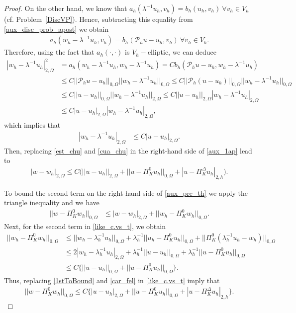 \documentclass[final,reqno]{elsarticle}
\def\O{\Omega}
\def\PiK{\Pi_{K}^{\Delta}}
\begin{document}
\begin{proof}
On the other hand, we know that $a_h(\lambda^{-1}u_h,v_h)=b_h(u_h,v_h)\ \forall v_h \in V_h $ (cf. Problem~\ref{DiscVP}). Hence, subtracting this equality from \eqref{aux_disc_prob_apost} we obtain 
\begin{align*}
a_h(w_h-\lambda^{-1}u_h,v_h)=b_h(\mathcal{P}_hu-u_h,v_h) \ \forall v_h \in V_h .
\end{align*}
Therefore, using the fact that $a_h(\cdot,\cdot)$ is $V_h-$elliptic, we can deduce
\begin{align}
|w_h-\lambda^{-1}u_h|_{2,\O}^2&=a_h(w_h-\lambda^{-1}u_h,w_h-\lambda^{-1}u_h)=Cb_h(\mathcal{P}_hu-u_h,w_h-\lambda^{-1}u_h)\nonumber\\
&\leq C || \mathcal{P}_hu-u_h||_{0,\O}||w_h-\lambda^{-1}u_h ||_{0,\O}\leq C || \mathcal{P}_h(u-u_h)||_{0,\O}||w_h-\lambda^{-1}u_h ||_{0,\O}\nonumber\\
&\leq C ||u-u_h||_{0,\O} ||w_h-\lambda^{-1}u_h ||_{2,\O}\leq C ||u-u_h||_{2,\O} |w_h-\lambda^{-1}u_h |_{2,\O}\nonumber\\
&\leq C |u-u_h|_{2,\O} |w_h-\lambda^{-1}u_h |_{2,\O},\nonumber
\end{align}
which implies that
\begin{align}
|w_h-\lambda^{-1}u_h|_{2,\O}&\leq C |u-u_h|_{2,\O} .\label{cua_chu}
\end{align}
Then, replacing \eqref{est_chu} and \eqref{cua_chu} in the right-hand side of \eqref{aux_1ap} lead to
\begin{align}
|w-w_h|_{2,\O}\leq C\Big( ||u-u_h||_{2,\Omega} + ||u-\Pi_K^0 u_h||_{0,\Omega} + |u- \PiK u_h|_{2,h}\Big)\label{1stToBound}.
\end{align}

To bound the second term on the right-hand side of \eqref{aux_pre_th} we apply the triangle inequality and we have
\begin{align}
||w-\Pi_K^0 w_h||_{0,\Omega}&\leq |w-w_h|_{2,\O}+||w_h-\Pi_K^0  w_h||_{0,\Omega}\label{like_c.vs_t}.
\end{align}
Next, for the second term in \eqref{like_c.vs_t}, we obtain
\begin{align}
||w_h-\Pi_K^0  w_h||_{0,\Omega}&\leq ||w_h-\lambda_h^{-1}u_h||_{0,\O}+\lambda_h^{-1}||u_h-\Pi_K^0 u_h||_{0,\Omega}+||\Pi_K^0(\lambda_h^{-1}u_h-w_h)||_{0,\Omega}\nonumber\\
&\leq 2|w_h-\lambda_h^{-1}u_h|_{2,\O}+\lambda_h^{-1}||u-u_h||_{0,\O}+\lambda_h^{-1}||u-\Pi_K^0 u_h||_{0,\Omega}\nonumber\\
&\leq C\Big\{||u-u_h||_{0,\O}+||u-\Pi_K^0 u_h||_{0,\Omega}\Big\}\label{car_fel}.
\end{align}
Thus, replacing  \eqref{1stToBound} and \eqref{car_fel} in \eqref{like_c.vs_t} imply that
\begin{align}
||w-\Pi_K^0  w_h||_{0,\Omega}\leq C\Big\{|u-u_h|_{2,\O}+||u-\Pi_K^0  u_h||_{0,\Omega}+|u-\PiK  u_h|_{2,h} \Big\}\label{2ndTermToBound}.
\end{align}


\end{proof}
\end{document}
